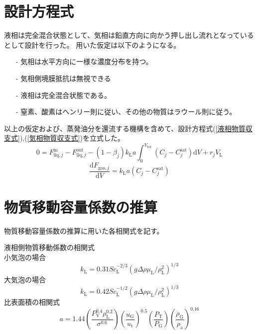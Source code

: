 \documentclass[a4j]{jsreport}
\begin{document}
\section{設計方程式}
液相は完全混合状態として、気相は鉛直方向に向かう押し出し流れとなっているとして設計を行った。
用いた仮定は以下のようになる。
\begin{itemize} 
    \item[-] 気相は水平方向に一様な濃度分布を持つ。
    \item[-] 気相側境膜抵抗は無視できる
    \item[-] 液相は完全混合状態である。
    \item[-] 窒素、酸素はヘンリー則に従い、その他の物質はラウール則に従う。
\end{itemize}
以上の仮定および、蒸発油分を還流する機構を含めて、設計方程式(\ref{液相物質収支式}),(\ref{気相物質収支式})を立式した。\\
\begin{equation}
    \label{液相物質収支式}
    0=F^{\mathrm{ in}}_{\mathrm{ liq},j}-F^{\mathrm{ out}}_{\mathrm{ liq},j} -(1-\beta_j) k_{\mathrm{ L}}a
    \int^{V_{\mathrm{ tot}}}_0(C_j - C^{\mathrm{ sat}}_j)\mathrm{ d}V + r_j V_{\mathrm{ L}}
\end{equation}
\begin{equation}
    \label{気相物質収支式}                                                
    \frac{\mathrm{ d}F_{\mathrm{ gas},j}}{\mathrm{ d}V} = k_{\mathrm{ L}}a(C_j - C^{\mathrm{ sat}}_j)
\end{equation}

\section{物質移動容量係数の推算}
物質移動容量係数の推算に用いた各相関式を記す。

液相側物質移動係数の相関式\\
小気泡の場合
\begin{equation}
    k_{\mathrm{ L}} = 0.31Sc_{\mathrm{ L}}^{-2/3}(g \Delta \rho \mu_{\mathrm{ L}}/\rho_{\mathrm{ L}}^2)^{1/3}
\end{equation}
大気泡の場合
\begin{equation}
    k_{\mathrm{ L}} = 0.42Sc_{\mathrm{ L}}^{-1/2}(g \Delta \rho \mu_{\mathrm{ L}}/\rho_{\mathrm{ L}}^2)^{1/3}
\end{equation}
比表面積の相関式
\begin{equation}
    a = 1.44(\frac{P_{\mathrm{ V}}^{0.4} \rho_{\mathrm{ L}}^{0.2} }{ \sigma^{0.6}})(\frac{u_{\mathrm{ G}}}{u_{\mathrm{ t}}})^{0.5}(\frac{P_{\mathrm{ T}}}{P_{\mathrm{ G}}})(\frac{\rho_{\mathrm{ G}}}{\rho_{\mathrm{ a}}})^{0.16}
\end{equation}
\end{document}
